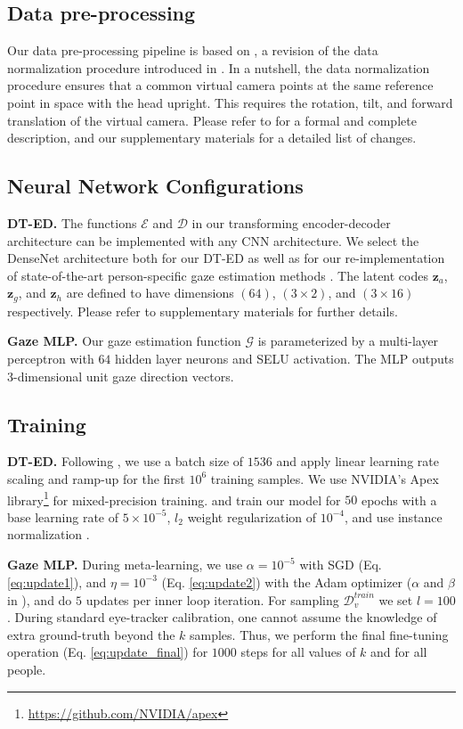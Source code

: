 \documentclass[10pt,twocolumn,letterpaper]{article}
\newcommand{\Paragraph}[1]
{\vspace{1.5mm} \noindent \textbf{#1}}
\begin{document}
\subsection{Data pre-processing\label{sec:pre-processing}}
Our data pre-processing pipeline is based on \cite{Zhang2018ETRA}, a revision of the data normalization procedure introduced in \cite{Sugano2014CVPR}. In a nutshell, the data normalization procedure ensures that a common virtual camera points at the same reference point in space with the head upright. This requires the rotation, tilt, and forward translation of the virtual camera. Please refer to \cite{Zhang2018ETRA} for a formal and complete description, and our supplementary materials for a detailed list of changes.

\subsection{Neural Network Configurations}
\Paragraph{DT-ED.}
The functions $\mathcal{E}$ and $\mathcal{D}$ in our transforming encoder-decoder architecture can be implemented with any CNN architecture. We select the DenseNet architecture \cite{Huang2017CVPR} both for  our DT-ED as well as for our re-implementation of state-of-the-art person-specific gaze estimation methods \cite{Liu2018BMVC,Zhang2019CHI}.
The latent codes $\mathbf{z}_a$, $\mathbf{z}_g$, and $\mathbf{z}_h$ are defined to have dimensions $(64)$, $(3\times 2)$, and $(3\times 16)$ respectively.
Please refer to supplementary materials for further details.

\Paragraph{Gaze MLP.}
Our gaze estimation function $\mathcal{G}$ is parameterized by a multi-layer perceptron with $64$ hidden layer neurons and SELU \cite{Klambauer2017NeurIPS} activation.
The MLP outputs 3-dimensional unit gaze direction vectors.

\subsection{Training}
\Paragraph{DT-ED.}
Following \cite{Goyal2017arXiv}, we use a batch size of $1536$ and apply linear learning rate scaling and ramp-up for the first $10^6$ training samples.
We use NVIDIA's Apex library\footnote{\url{https://github.com/NVIDIA/apex}} for mixed-precision training. 
and train our model for $50$ epochs with a base learning rate of $5\times 10^{-5}$, $l_2$ weight regularization  of $10^{-4}$, and use instance normalization \cite{Ulyanov2016arXiv}. 

\Paragraph{Gaze MLP.}
During meta-learning, we use $\alpha = 10^{-5}$ with SGD (Eq. \ref{eq:update1}), and  $\eta = 10^{-3}$ (Eq. \ref{eq:update2}) with the Adam optimizer ($\alpha$ and $\beta$ in \cite{Finn2017ICML}), and do $5$ updates per inner loop iteration. For sampling $\mathcal{D}^{train}_v$ we set $l=100$. 
During standard eye-tracker calibration, one cannot assume the knowledge of extra ground-truth beyond the $k$ samples.
Thus, we perform the final fine-tuning operation (Eq. \ref{eq:update_final}) for $1000$ steps for all values of $k$ and for all people.
\end{document}
